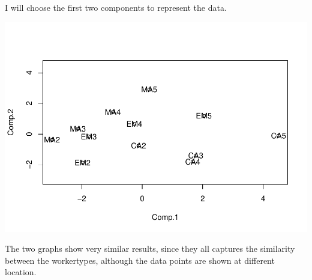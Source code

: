 \documentclass[
]{article}
\newenvironment{Shaded}{\begin{snugshade}}{\end{snugshade}}
\newcommand{\AttributeTok}[1]{\textcolor[rgb]{0.77,0.63,0.00}{#1}}
\newcommand{\DecValTok}[1]{\textcolor[rgb]{0.00,0.00,0.81}{#1}}
\newcommand{\FunctionTok}[1]{\textcolor[rgb]{0.00,0.00,0.00}{#1}}
\newcommand{\NormalTok}[1]{#1}
\newcommand{\OtherTok}[1]{\textcolor[rgb]{0.56,0.35,0.01}{#1}}
\newcommand{\SpecialCharTok}[1]{\textcolor[rgb]{0.00,0.00,0.00}{#1}}
\begin{document}
I will choose the first two components to represent the data.

\begin{Shaded}
\end{Shaded}

\includegraphics{HUDM6122-Homework_08-Chenguang-Pan_files/figure-latex/unnamed-chunk-11-1.pdf}

The two graphs show very similar results, since they all captures the
similarity between the workertypes, although the data points are shown
at different location.
\end{document}
